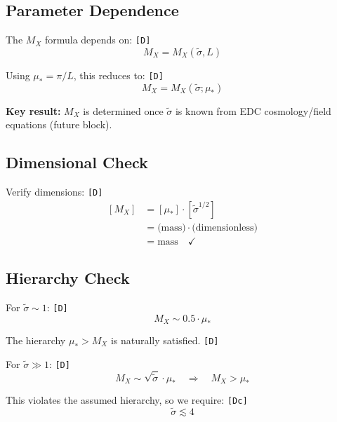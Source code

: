 \documentclass[11pt,a4paper]{article}
\newcommand{\tagD}{\textcolor{green!50!black}{\texttt{[D]}}}
\newcommand{\tagDc}{\textcolor{blue!70!black}{\texttt{[Dc]}}}
\theoremstyle{definition}
\begin{document}
\subsection{Parameter Dependence}
\label{subsec:param-dependence}

The $M_X$ formula depends on: \tagD{}
\begin{equation}
\label{eq:mx-parameters}
M_X = M_X(\tilde{\sigma}, L)
\end{equation}

Using $\mu_* = \pi/L$, this reduces to: \tagD{}
\begin{equation}
\label{eq:mx-single-param}
M_X = M_X(\tilde{\sigma}; \mu_*)
\end{equation}

\textbf{Key result:} $M_X$ is determined once $\tilde{\sigma}$ is known from EDC
cosmology/field equations (future block).

\subsection{Dimensional Check}
\label{subsec:dimensional-check}

Verify dimensions: \tagD{}
\begin{align}
\label{eq:dim-check-1}
[M_X] &= [\mu_*] \cdot [\tilde{\sigma}^{1/2}] \\
\label{eq:dim-check-2}
&= \text{(mass)} \cdot \text{(dimensionless)} \\
\label{eq:dim-check-3}
&= \text{mass} \quad \checkmark
\end{align}

\subsection{Hierarchy Check}
\label{subsec:hierarchy-check}

For $\tilde{\sigma} \sim 1$: \tagD{}
\begin{equation}
\label{eq:hierarchy-natural}
M_X \sim 0.5 \cdot \mu_*
\end{equation}

The hierarchy $\mu_* > M_X$ is naturally satisfied. \tagD{}

For $\tilde{\sigma} \gg 1$: \tagD{}
\begin{equation}
\label{eq:hierarchy-large}
M_X \sim \sqrt{\tilde{\sigma}} \cdot \mu_* \quad \Rightarrow \quad M_X > \mu_*
\end{equation}

This violates the assumed hierarchy, so we require: \tagDc{}
\begin{equation}
\label{eq:sigma-bound}
\tilde{\sigma} \lesssim 4
\end{equation}
\end{document}
